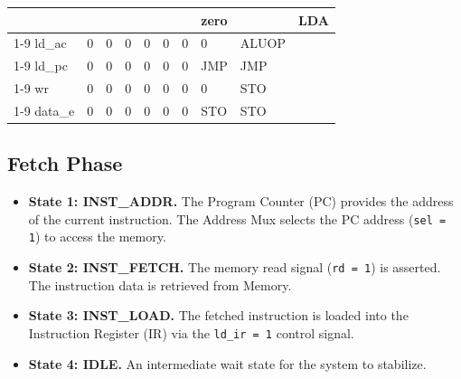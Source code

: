 \begin{table}[H]
\begin{center}
{\begin{tabular}[h]{|l|l|l|l|l|l|l|l|l|l|}
				                                  &                                     &                                 &                     &                    &                    &                    & zero             &                    & LDA     \\ \cline{1-9}
				ld\_ac                            & 0                                   & 0                               & 0                   & 0                  & 0                  & 0                  & 0                & ALUOP              &         \\ \cline{1-9}
				ld\_pc                            & 0                                   & 0                               & 0                   & 0                  & 0                  & 0                  & JMP              & JMP                &         \\ \cline{1-9}
				wr                                & 0                                   & 0                               & 0                   & 0                  & 0                  & 0                  & 0                & STO                &         \\ \cline{1-9}
				data\_e                           & 0                                   & 0                               & 0                   & 0                  & 0                  & 0                  & STO              & STO                &         \\ \hline
			\end{tabular}
		}
	\end{center}
\end{table}

\subsection{Fetch Phase}
\begin{itemize}
	\item \textbf{State 1: INST\_ADDR.} The Program Counter (PC) provides the address of the current instruction. The Address Mux selects the PC address (\texttt{sel = 1}) to access the memory.
	\item \textbf{State 2: INST\_FETCH.} The memory read signal (\texttt{rd = 1}) is asserted. The instruction data is retrieved from Memory.
	\item \textbf{State 3: INST\_LOAD.} The fetched instruction is loaded into the Instruction Register (IR) via the \texttt{ld\_ir = 1} control signal.
	\item \textbf{State 4: IDLE.} An intermediate wait state for the system to stabilize.
\end{itemize}

